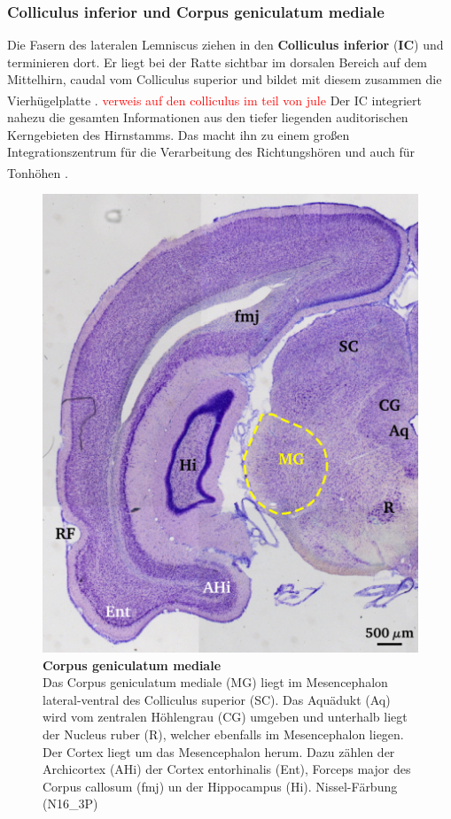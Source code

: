 \documentclass[12pt,a4paper,pdftex]{article}
\begin{document}
\newpage
\subsubsection*{Colliculus inferior und Corpus geniculatum mediale}

Die Fasern des lateralen Lemniscus ziehen in den \textbf{Colliculus inferior} (\textbf{IC})  und terminieren dort. Er liegt bei der Ratte sichtbar im dorsalen Bereich auf dem Mittelhirn, caudal vom Colliculus superior und bildet mit diesem zusammen die Vierhügelplatte \textsuperscript{\cite[29]{paxinos2014rat}}. \textcolor{red}{verweis auf den colliculus im teil von jule} 
Der IC integriert nahezu die gesamten Informationen aus den tiefer liegenden auditorischen Kerngebieten des Hirnstamms. Das macht ihn zu einem großen Integrationszentrum für die Verarbeitung des Richtungshören und auch für Tonhöhen \textsuperscript{\cite[29]{paxinos2014rat}}.
\\

\begin{figure}[H]
    \centering
    \includegraphics{pictures/auditory/MG.png}
    \caption[Corpus geniculatum mediale]{\textbf{Corpus geniculatum mediale}\\
    Das Corpus geniculatum mediale (MG) liegt im Mesencephalon lateral-ventral des Colliculus superior (SC). Das Aquädukt (Aq) wird vom zentralen Höhlengrau (CG) umgeben und unterhalb liegt der Nucleus ruber (R), welcher ebenfalls im Mesencephalon liegen. Der Cortex liegt um das Mesencephalon herum. Dazu zählen der Archicortex (AHi) der Cortex entorhinalis (Ent), Forceps major des Corpus callosum (fmj) un der Hippocampus (Hi). Nissel-Färbung (N16\_3P)}
    \label{fig:MG}
\end{figure}
\end{document}
